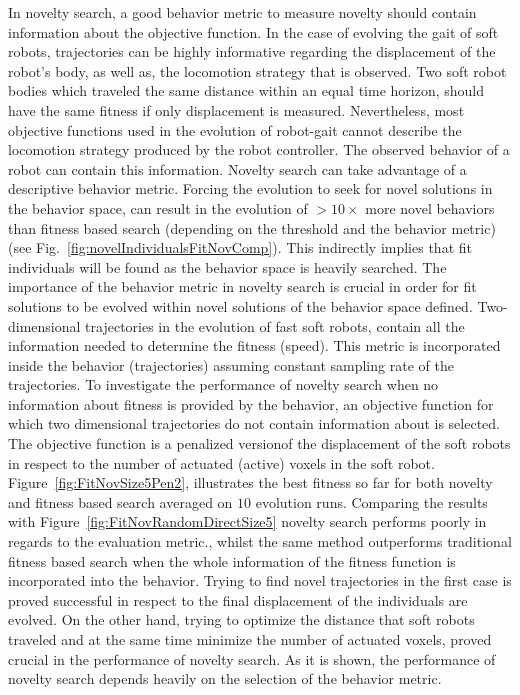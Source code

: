 In novelty search, a good behavior metric to measure novelty should contain information about the objective function. In the case of evolving the gait of soft robots, trajectories can be highly informative regarding the displacement of the robot's body, as well as, the locomotion strategy that is observed. Two soft robot bodies which traveled the same distance within an equal time horizon, should have the same fitness if only displacement is measured. Nevertheless, most objective functions used in the evolution of robot-gait cannot describe the locomotion strategy produced by the robot controller. The observed behavior of a robot can contain this information. Novelty search can take advantage of a descriptive behavior metric. Forcing the evolution to seek for  novel solutions in the behavior space, can result in the evolution of $>10 \times$ more novel behaviors than fitness based search (depending on the threshold and the behavior metric) (see Fig.~\ref{fig:novelIndividualsFitNovComp}). This indirectly implies that fit individuals will be found as the behavior space is heavily searched. The importance of the behavior metric in novelty search is crucial in order for fit solutions to be evolved within novel solutions of the behavior space defined. Two-dimensional trajectories in the evolution of fast soft robots, contain all the information needed to determine the fitness (speed). This metric is incorporated inside the behavior (trajectories) assuming constant sampling rate of the trajectories. To investigate the performance of novelty search when no information about fitness is provided by the behavior, an objective function for which two dimensional trajectories do not contain information about is selected. The objective function is a penalized version\footnotemark of the displacement of the soft robots in respect to the number of actuated (active) voxels in the soft robot. Figure~\ref{fig:FitNovSize5Pen2}, illustrates the best fitness so far for both novelty and fitness based search averaged on $10$ evolution runs. Comparing the results with Figure~\ref{fig:FitNovRandomDirectSize5} novelty search performs poorly in regards to the evaluation metric., whilst the same method outperforms traditional fitness based search when the whole information of the fitness function is incorporated into the behavior. Trying to find novel trajectories in the first case is proved successful in respect to the final displacement of the individuals are evolved. On the other hand, trying to optimize the distance that soft robots traveled and at the same time minimize the number of actuated voxels, proved crucial in the performance of novelty search. As it is shown, the performance of novelty search depends heavily on the selection of the behavior metric.


